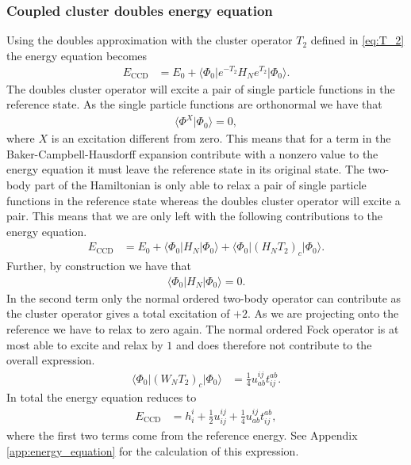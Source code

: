 \documentclass[
    a4paper, aps, twocolumn, floatfix, superscriptaddress,
    nofootinbib]{revtex4-1}
\newcommand{\1}{\mathds{1}}
\newcommand{\half}{\frac{1}{2}}
\newcommand{\bra}[1]{\langle #1\lvert}
\newcommand{\ket}[1]{\rvert #1\rangle}
\newcommand{\braket}[2]{\langle #1 \vert #2 \rangle}
\newcommand{\kslat}{\ket{\Phi_0}}
\newcommand{\bslat}{\bra{\Phi_0}}
\newcommand{\eccd}{E_{\text{CCD}}}
\begin{document}
        \subsubsection{Coupled cluster doubles energy equation}
            Using the doubles approximation with the cluster operator $T_2$
            defined in \autoref{eq:T_2} the energy equation becomes
            \begin{align}
                \eccd
                &=
                E_0
                + \bslat e^{-T_2}H_N e^{T_2}\kslat.
            \end{align}
            The doubles cluster operator will excite a pair of single particle
            functions in the reference state. As the single particle functions
            are orthonormal we have that
            \begin{align}
                \braket{\Phi^{X}}{\Phi_0} = 0,
            \end{align}
            where $X$ is an excitation different from zero. This means that for
            a term in the Baker-Campbell-Hausdorff expansion contribute with a
            nonzero value to the energy equation it must leave the reference
            state in its original state. The two-body part of the Hamiltonian is
            only able to relax a pair of single particle functions in the
            reference state whereas the doubles cluster operator will excite a
            pair. This means that we are only left with the following
            contributions to the energy equation.
            \begin{align}
                \eccd
                &=
                E_0
                + \bslat H_N \kslat + \bslat (H_N T_2)_c\kslat.
            \end{align}
            Further, by construction we have that
            \begin{align}
                \bslat H_N \kslat = 0.
            \end{align}
            In the second term only the normal ordered two-body operator can
            contribute as the cluster operator gives a total excitation of $+2$.
            As we are projecting onto the reference we have to relax to zero
            again. The normal ordered Fock operator is at most able to excite
            and relax by $1$ and does therefore not contribute to the
            overall expression.
            \begin{align}
                \bslat (W_N T_2)_c \kslat
                &= \frac{1}{4}u^{ij}_{ab}t^{ab}_{ij}.
            \end{align}
            In total the energy equation reduces to
            \begin{align}
                \eccd
                &= h^i_i + \half u^{ij}_{ij}
                + \frac{1}{4} u^{ij}_{ab}t^{ab}_{ij},
                \label{eq:ccd_energy}
            \end{align}
            where the first two terms come from the reference energy. See
            Appendix \ref{app:energy_equation} for the calculation of this
            expression.
\end{document}
